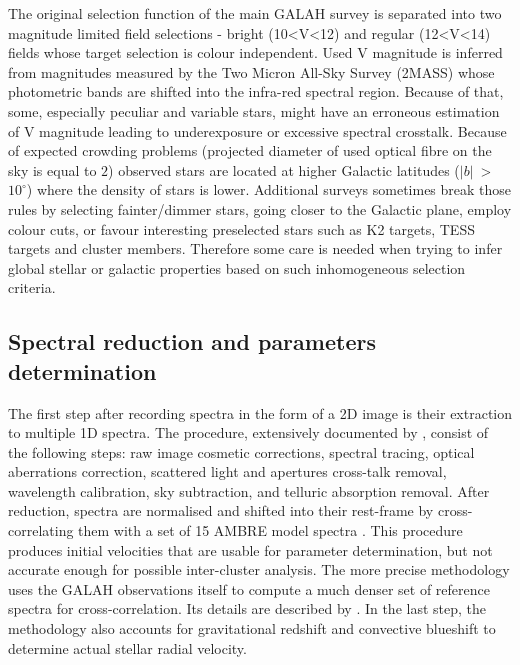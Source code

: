 The original selection function of the main GALAH survey is separated into two magnitude limited field selections - bright (10<V<12) and regular (12<V<14) fields whose target selection is colour independent. Used V magnitude is inferred from magnitudes measured by the Two Micron All-Sky Survey (2MASS) \cite{2006AJ....131.1163S} whose photometric bands are shifted into the infra-red spectral region. Because of that, some, especially peculiar and variable stars, might have an erroneous estimation of V magnitude leading to underexposure or excessive spectral crosstalk. Because of expected crowding problems (projected diameter of used optical fibre on the sky is equal to $2$\arcsec) observed stars are located at higher Galactic latitudes ($|b|$~>~$10^\circ$) where the density of stars is lower. Additional surveys sometimes break those rules by selecting fainter/dimmer stars, going closer to the Galactic plane, employ colour cuts, or favour interesting preselected stars such as K2 \cite{2014PASP..126..398H} targets, TESS \cite{2015JATIS...1a4003R} targets and cluster members. Therefore some care is needed when trying to infer global stellar or galactic properties based on such inhomogeneous selection criteria.

\subsection{Spectral reduction and parameters determination}
The first step after recording spectra in the form of a 2D image is their extraction to multiple 1D spectra. The procedure, extensively documented by \citet{2017MNRAS.464.1259K}, consist of the following steps: raw image cosmetic corrections, spectral tracing, optical aberrations correction, scattered light and apertures cross-talk removal, wavelength calibration, sky subtraction, and telluric absorption removal. After reduction, spectra are normalised and shifted into their rest-frame by cross-correlating them with a set of 15 AMBRE model spectra \cite{2012A&A...544A.126D}. This procedure produces initial velocities that are usable for parameter determination, but not accurate enough for possible inter-cluster analysis. The more precise methodology uses the GALAH observations itself to compute a much denser set of reference spectra for cross-correlation. Its details are described by \citet{2018arXiv180406344Z}. In the last step, the methodology also accounts for gravitational redshift and convective blueshift to determine actual stellar radial velocity. 

